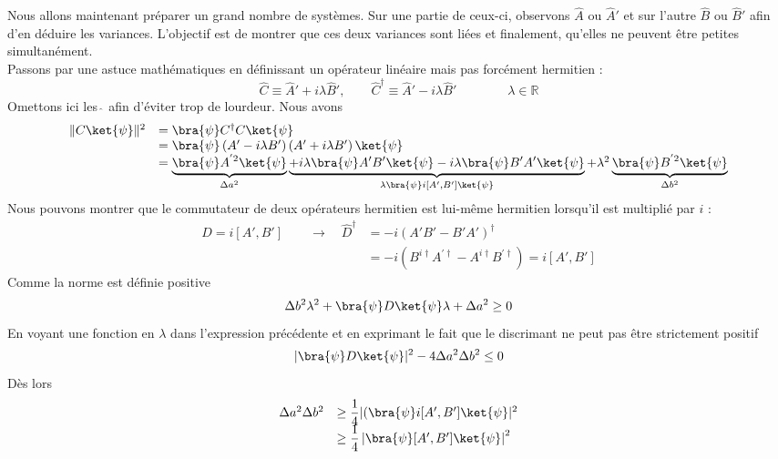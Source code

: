  
 Nous allons maintenant préparer un grand nombre de systèmes. Sur une partie de ceux-ci, 
 observons $\hat{A}$ ou $\hat{A}'$ et sur l'autre $\hat{B}$ ou $\hat{B}'$ afin d'en 
 déduire les variances. L'objectif est de montrer que ces deux variances sont liées et 
 finalement, qu'elles ne peuvent être petites simultanément.\\
 Passons par une astuce mathématiques en définissant un opérateur linéaire mais pas 
 forcément hermitien :
 \begin{equation}
 \hat{C} \equiv \hat{A}' + i\lambda \hat{B}',\qquad
  \hat{C}^\dagger \equiv \hat{A}' - i\lambda \hat{B}'\qquad\qquad\lambda\in\mathbb{R}
 \end{equation}
 Omettons ici les $\hat{\ }$  afin d'éviter trop de lourdeur. Nous avons
 \begin{equation}
 \begin{array}{ll}
 \|C\ket{\psi}\|^2 &= \bra{\psi}C^\dagger C\ket{\psi}\\
 &= \bra{\psi}\left(A'-i\lambda B'\right)\left(A'+i\lambda B'\right)\ket{\psi}\\
 &= \underbrace{\bra{\psi}A^{'2}\ket{\psi}}_{\Delta a^2}\underbrace{+i\lambda\bra{\psi}
 A'B'\ket{\psi}-i\lambda\bra{\psi}B'A'\ket{\psi}}_{\lambda\bra{\psi}i[A',B']\ket{\psi}} 
 + \lambda^2\underbrace{\bra{\psi}B^{'2}\ket{\psi}}_{ \Delta b^2}
 \end{array}
 \end{equation}
 Nous pouvons montrer que le commutateur de deux opérateurs hermitien est lui-même 
 hermitien lorsqu'il est multiplié par $i$ :
 \begin{equation}
 \begin{array}{ll}
 \hat{D} = i[A',B']\qquad \rightarrow\quad \hat{D}^\dagger &=-i(A'B'-B'A')^\dagger\\
 &= -i(B^{i\dagger}A^{'\dagger}-A^{i\dagger}B^{'\dagger}) = i[A',B']
 \end{array}
 \end{equation}
 Comme la norme est définie positive
 \begin{equation}
 \Delta b^2\lambda^2 + \bra{\psi}D\ket{\psi}\lambda + \Delta a^2 \geq 0
 \end{equation}
 En voyant une fonction en $\lambda$ dans l'expression précédente
 et en exprimant le fait que le discrimant ne peut pas être strictement positif
 \begin{equation}
 |\bra{\psi}D\ket{\psi}|^2 - 4\Delta a^2\Delta b^2 \leq 0
 \end{equation}
 Dès lors
 \begin{equation}
 \begin{array}{ll}
 \Delta a^2 \Delta b^2 &\geq \dfrac{1}{4}|(\bra{\psi}i[A',B']\ket{\psi}|^2\\
 &\geq \dfrac{1}{4}\left|\bra{\psi}[A',B']\ket{\psi}\right|^2
 \end{array}
 \end{equation}
